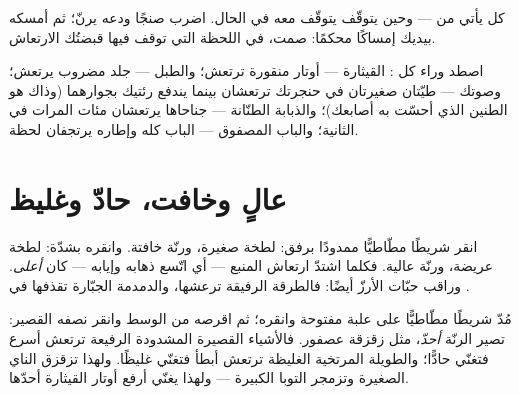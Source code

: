 \begin{proposition}\label{prop:g3:sound-around-us:novib}
كل  يأتي من  --- وحين يتوقّف  يتوقّف  معه
في الحال. اضرب صنجًا ودعه يرنّ؛ ثم أمسكه بيديك إمساكًا محكمًا:
صمت، في اللحظة التي توقف فيها قبضتُك الارتعاش.
\end{proposition}

\begin{example}\label{ex:g3:sound-around-us:sources}
اصطد  وراء كل : القيثارة --- أوتار منقورة ترتعش؛
والطبل --- جلد مضروب يرتعش؛ وصوتك --- طيّتان صغيرتان في حنجرتك
ترتعشان بينما يندفع  رئتيك بجوارهما (وذاك هو الطنين الذي
أحسّت به أصابعك)؛ والذبابة الطنّانة --- جناحاها يرتعشان مئات
المرات في الثانية؛ والباب المصفوق --- الباب كله وإطاره يرتجفان
لحظة.
\end{example}

\section{عالٍ وخافت، حادّ وغليظ}

\begin{example}\label{ex:g3:sound-around-us:loud}
انقر شريطًا مطّاطيًّا ممدودًا برفق: لطخة صغيرة، ورنّة خافتة.
وانقره بشدّة: لطخة عريضة، ورنّة عالية. فكلما اشتدّ ارتعاش المنبع
--- أي اتّسع ذهابه وإيابه --- كان  \emph{أعلى}. وراقب
حبّات الأرزّ أيضًا: فالطرقة الرفيقة ترعشها، والدمدمة الجبّارة
تقذفها في .
\end{example}

\begin{example}\label{ex:g3:sound-around-us:pitch}
مُدّ شريطًا مطّاطيًّا على علبة مفتوحة وانقره؛ ثم اقرصه من الوسط
وانقر نصفه القصير: تصير الرنّة \emph{أحدّ}، مثل زقزقة عصفور.
فالأشياء القصيرة المشدودة الرفيعة ترتعش أسرع فتغنّي حادًّا؛
والطويلة المرتخية الغليظة ترتعش أبطأ فتغنّي غليظًا. ولهذا تزقزق
الناي الصغيرة وتزمجر التوبا الكبيرة --- ولهذا يغنّي أرفع أوتار
القيثارة أحدّها.
\end{example}

